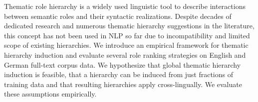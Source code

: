 Thematic role hierarchy is a widely used linguistic tool to describe interactions between semantic roles and their syntactic realizations. Despite decades of dedicated research and numerous thematic hierarchy suggestions in the literature, this concept has not been used in NLP so far due to incompatibility and limited scope of existing hierarchies. We introduce an empirical framework for thematic hierarchy induction and evaluate several role ranking strategies on English and German full-text corpus data. We hypothesize that global thematic hierarchy induction is feasible, that a hierarchy can be induced from just fractions of training data and that resulting hierarchies apply cross-lingually. We evaluate these assumptions empirically.
